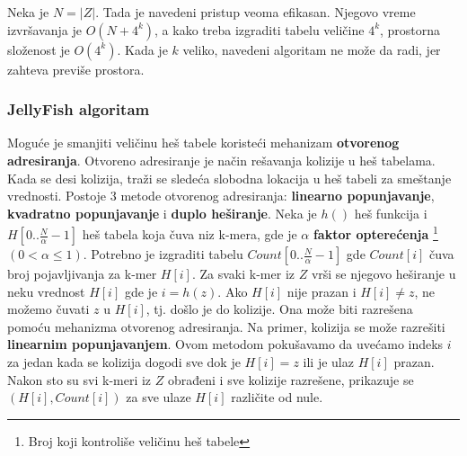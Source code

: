 \documentclass[12pt,oneside]{memoir}
\begin{document}
Neka je $N = |Z|$. Tada je navedeni pristup veoma efikasan. Njegovo vreme izvršavanja je $O(N + 4^k)$, a kako treba izgraditi tabelu veličine $4^k$, prostorna složenost je $O(4^k)$. Kada je $k$ veliko, navedeni algoritam ne može da radi, jer zahteva previše prostora.


\subsubsection{JellyFish algoritam}
Moguće je smanjiti veličinu heš tabele koristeći mehanizam \textbf{otvorenog adresiranja}. Otvoreno adresiranje je način rešavanja kolizije u heš tabelama. Kada se desi kolizija, traži se sledeća slobodna lokacija u heš tabeli za smeštanje vrednosti. Postoje 3 metode otvorenog adresiranja: \textbf{linearno popunjavanje}, \textbf{kvadratno popunjavanje} i \textbf{duplo heširanje}. Neka je $h()$ heš funkcija i $H[0..\frac{N}{\alpha} - 1]$ heš tabela koja čuva niz k-mera, gde je $\alpha$ \textbf{faktor opterećenja}  \footnote{Broj koji kontroliše veličinu heš tabele} $(0 < \alpha \leq 1)$. Potrebno je izgraditi tabelu $Count[0..\frac{N}{\alpha} - 1]$ gde $Count[i]$ čuva broj pojavljivanja za k-mer $H[i]$. Za svaki k-mer iz $Z$ vrši se njegovo  heširanje u neku vrednost $H[i]$ gde je $i = h(z)$. Ako $H[i]$ nije prazan i $H[i] \neq z$, ne možemo čuvati $z$ u $H[i]$, tj. došlo je do kolizije. Ona može biti razrešena pomoću mehanizma otvorenog adresiranja. Na primer, kolizija se može razrešiti \textbf{linearnim popunjavanjem}. Ovom metodom pokušavamo da uvećamo indeks $i$ za jedan kada se kolizija dogodi sve dok je $H[i] = z$ ili je ulaz $H[i]$ prazan. Nakon sto su svi k-meri iz $Z$ obrađeni i sve kolizije razrešene, prikazuje se $(H[i], Count[i])$ za sve ulaze $H[i]$ različite od nule.
\end{document}
